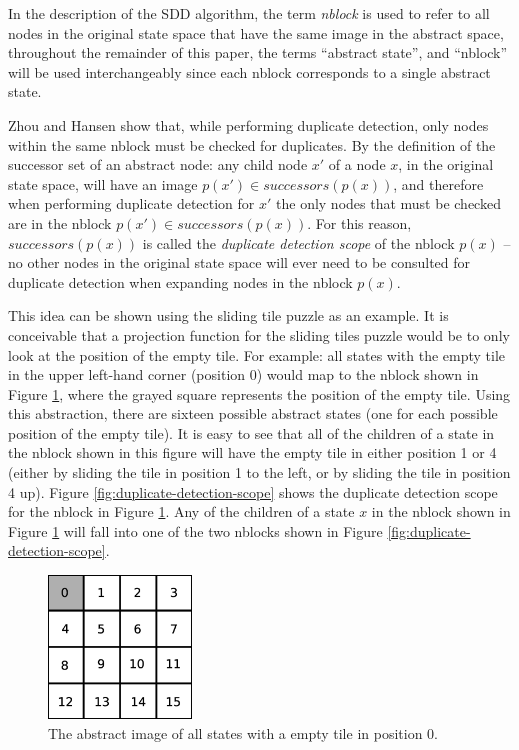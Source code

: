\documentclass{article} \usepackage{aaai} \usepackage{graphicx}
\begin{document}
In the description of the SDD algorithm, the term \emph{nblock} is
used to refer to all nodes in the original state space that have the
same image in the abstract space, throughout the remainder of this
paper, the terms ``abstract state'', and ``nblock'' will be used
interchangeably since each nblock corresponds to a single abstract
state.

Zhou and Hansen show that, while performing duplicate detection, only
nodes within the same nblock must be checked for duplicates.  By the
definition of the successor set of an abstract node: any child node
$x'$ of a node $x$, in the original state space, will have an image
$p(x') \in successors(p(x))$, and therefore when performing duplicate
detection for $x'$ the only nodes that must be checked are in the
nblock $p(x') \in successors(p(x))$.  For this reason,
$successors(p(x))$ is called the \emph{duplicate detection scope} of
the nblock $p(x)$ -- no other nodes in the original state space will
ever need to be consulted for duplicate detection when expanding nodes
in the nblock $p(x)$.

This idea can be shown using the sliding tile puzzle as an example.
It is conceivable that a projection function for the sliding tiles
puzzle would be to only look at the position of the empty tile.  For
example: all states with the empty tile in the upper left-hand corner
(position 0) would map to the nblock shown in Figure
\ref{fig:tile-abstraction}, where the grayed square represents the
position of the empty tile.  Using this abstraction, there are sixteen
possible abstract states (one for each possible position of the empty
tile).  It is easy to see that all of the children of a state in the
nblock shown in this figure will have the empty tile in either
position 1 or 4 (either by sliding the tile in position 1 to the left,
or by sliding the tile in position 4 up).  Figure
\ref{fig:duplicate-detection-scope} shows the duplicate detection
scope for the nblock in Figure \ref{fig:tile-abstraction}.  Any of the
children of a state $x$ in the nblock shown in Figure
\ref{fig:tile-abstraction} will fall into one of the two nblocks shown
in Figure \ref{fig:duplicate-detection-scope}.

\begin{figure}[t]
\begin{center}
\includegraphics[width=1.5in]{images/tile-abstraction.eps}
\caption{The abstract image of all states with a empty tile in
  position 0.}
\label{fig:tile-abstraction}
\end{center}
\end{figure}
\end{document}
